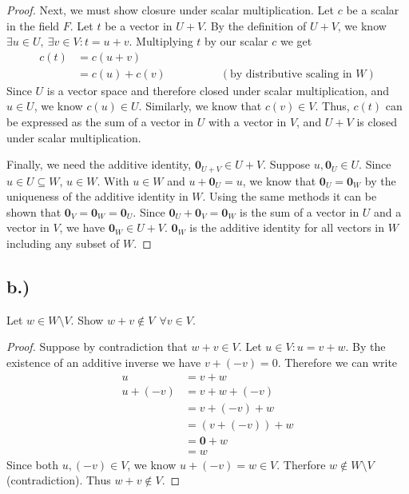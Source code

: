\documentclass{article}
\begin{document}
\begin{proof}
		Next, we must show closure under scalar multiplication. Let $c$ be a scalar in the field $F$. Let $t$ be a vector in $U + V$. By the definition of $U + V$, we know $\exists u \in U, \ \exists v \in V : t = u + v$. Multiplying $t$ by our scalar $c$ we get 
		\begin{align*}
		c(t) & = c(u+v) \\
		& = c(u) + c(v) \ \ \ \ \ \ \ \ \ \ \ \ \ \ \ \ \ \ \ \ \ \ ( \text{by distributive scaling in } W)
		\end{align*}
		Since $U$ is a vector space and therefore closed under scalar multiplication, and $u \in U$, we know $c(u) \in U$. Similarly, we know that $c(v) \in V$. Thus, $c(t)$ can be expressed as the sum of a vector in $U$ with a vector in $V$, and $U + V$ is closed under scalar multiplication.
		
		Finally, we need the additive identity, $\mathbf{0}_{U+V} \in U + V$. Suppose $u, \mathbf{0}_U \in U$. Since $u \in U \subseteq W$, $u \in W$. With $u \in W$ and $u + \mathbf{0}_U = u$, we know that $\mathbf{0}_U = \mathbf{0}_W$ by the uniqueness of the additive identity in $W$. Using the same methods it can be shown that $\mathbf{0}_V = \mathbf{0}_W = \mathbf{0}_U$. Since $\mathbf{0}_U + \mathbf{0}_V = \mathbf{0}_W$ is the sum of a vector in $U$ and a vector in $V$, we have $\mathbf{0}_W \in U + V$. $\mathbf{0}_W$ is the additive identity for all vectors in $W$ including any subset of $W$.
		
	\end{proof}
	
	\subsection*{b.)}
	Let $w \in W \setminus V$. Show $w + v \notin V \ \ \forall v \in V$.
	
	\begin{proof}
	Suppose by contradiction that $w + v \in V$. Let $u \in V : u = v + w$. By the existence of an additive inverse we have $v + (-v) = 0$. Therefore we can write
	\begin{align*}
	u & = v + w \\
	u + (-v) & = v + w + (-v) \\
	& = v + (-v) + w \\
	& = (v + (-v)) + w \\
	& = \mathbf{0} + w\\
	& = w
	\end{align*}
	Since both $u ,(-v) \in V$, we know $u + (-v) = w \in V$. Therfore $w \notin W \setminus V$ (contradiction). Thus $w + v \notin V$.
	
	\end{proof}
	
\end{document}
